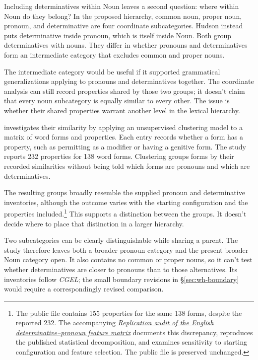 \documentclass[12pt]{article}
\begin{document}
Including determinatives within Noun leaves a second question: where within Noun do they belong? In the proposed hierarchy, common noun, proper noun, pronoun, and determinative are four coordinate subcategories. Hudson instead puts determinative inside pronoun, which is itself inside Noun. Both group determinatives with nouns. They differ in whether pronouns and determinatives form an intermediate category that excludes common and proper nouns.

The intermediate category would be useful if it supported grammatical generalizations applying to pronouns and determinatives together. The coordinate analysis can still record properties shared by those two groups; it doesn't claim that every noun subcategory is equally similar to every other. The issue is whether their shared properties warrant another level in the lexical hierarchy.

\textcite{reynolds2021} investigates their similarity by applying an unsupervised clustering model to a matrix of word forms and properties. Each entry records whether a form has a property, such as permitting  as a modifier or having a genitive form. The study reports 232 properties for 138 word forms. Clustering groups forms by their recorded similarities without being told which forms are pronouns and which are determinatives.

The resulting groups broadly resemble the supplied pronoun and determinative inventories, although the outcome varies with the starting configuration and the properties included.\footnote{The public file contains 155 properties for the same 138 forms, despite the reported 232. The accompanying \href{run:matrix-audit.pdf}{\textit{Replication audit of the English determinative--pronoun feature matrix}} documents this discrepancy, reproduces the published statistical decomposition, and examines sensitivity to starting configuration and feature selection. The public file is preserved unchanged.} This supports a distinction between the groups. It doesn't decide where to place that distinction in a larger hierarchy.

Two subcategories can be clearly distinguishable while sharing a parent. The study therefore leaves both a broader pronoun category and the present broader Noun category open. It also contains no common or proper nouns, so it can't test whether determinatives are closer to pronouns than to those alternatives. Its inventories follow \textit{CGEL}; the small boundary revisions in §\ref{sec:wh-boundary} would require a correspondingly revised comparison.
\end{document}
